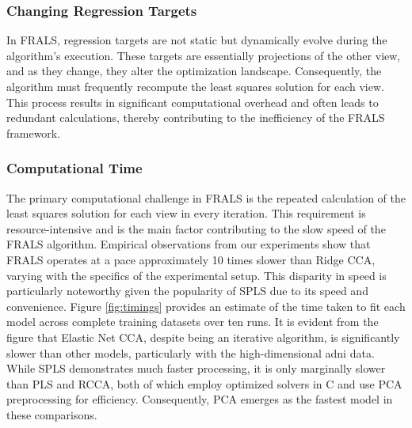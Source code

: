 \subsubsection{Changing Regression Targets}

In FRALS, regression targets are not static but dynamically evolve during the algorithm's execution. These targets are essentially projections of the other view, and as they change, they alter the optimization landscape. Consequently, the algorithm must frequently recompute the least squares solution for each view. This process results in significant computational overhead and often leads to redundant calculations, thereby contributing to the inefficiency of the FRALS framework.

\subsubsection{Computational Time}

The primary computational challenge in FRALS is the repeated calculation of the least squares solution for each view in every iteration. This requirement is resource-intensive and is the main factor contributing to the slow speed of the FRALS algorithm. Empirical observations from our experiments show that FRALS operates at a pace approximately 10 times slower than Ridge CCA, varying with the specifics of the experimental setup. This disparity in speed is particularly noteworthy given the popularity of SPLS due to its speed and convenience. Figure \ref{fig:timings} provides an estimate of the time taken to fit each model across complete training datasets over ten runs. It is evident from the figure that Elastic Net CCA, despite being an iterative algorithm, is significantly slower than other models, particularly with the high-dimensional \acrshort{adni} data. While SPLS demonstrates much faster processing, it is only marginally slower than PLS and RCCA, both of which employ optimized solvers in C and use PCA preprocessing for efficiency. Consequently, PCA emerges as the fastest model in these comparisons.

